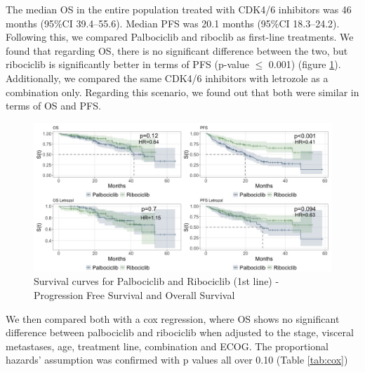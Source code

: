 The median OS in the entire population treated with CDK4/6 inhibitors was 46 months (95\%CI 39.4–55.6). Median PFS was 20.1 months (95\%CI 18.3–24.2). 
Following this, we compared Palbociclib and riboclib as first-line treatments. We found that regarding OS, there is no significant difference between the two, but ribociclib is significantly better in terms of PFS (p-value $\le$ 0.001) (figure \ref*{fig:interest}).
Additionally, we compared the same CDK4/6 inhibitors with letrozole as a combination only. Regarding this scenario, we found out that both were similar in terms of OS and PFS.


\begin{figure}[ht]
  \caption{Survival curves for Palbociclib and Ribociclib (1st line) - Progression Free Survival and Overall Survival}\label{fig:interest} 
  \includegraphics[scale=0.45]{figures/interest_curve_both.jpeg}%

\end{figure}

We then compared both with a cox regression, where OS shows no significant difference between palbociclib and ribociclib when adjusted to the stage, visceral metastases, age, treatment line, combination and ECOG. The proportional hazards' assumption was confirmed with p values all over 0.10  (Table \ref*{tab:cox})

